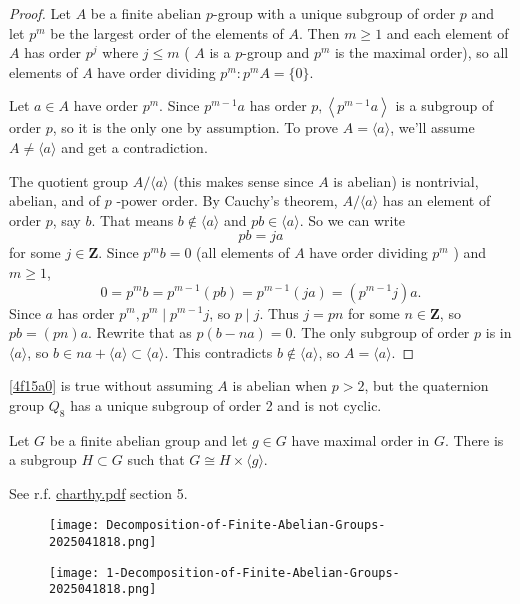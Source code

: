 \begin{proof}
Let $A$ be a finite abelian $p$-group with a unique subgroup of order $p$ and let $p^m$ be the largest order of the elements of $A$. Then $m \geq 1$ and each element of $A$ has order $p^j$ where $j \leq m$ ( $A$ is a $p$-group and $p^m$ is the maximal order), so all elements of $A$ have order dividing $p^m: p^m A=\{0\}$.

Let $a \in A$ have order $p^m$. Since $p^{m-1} a$ has order $p,\left\langle p^{m-1} a\right\rangle$ is a subgroup of order $p$, so it is the only one by assumption. To prove $A=\langle a\rangle$, we'll assume $A \neq\langle a\rangle$ and get a contradiction.

The quotient group $A /\langle a\rangle$ (this makes sense since $A$ is abelian) is nontrivial, abelian, and of $p$ -power order. By Cauchy's theorem, $A /\langle a\rangle$ has an element of order $p$, say $b$. That means $b \notin\langle a\rangle$ and $p b \in\langle a\rangle$. So we can write
\[
p b=j a
\]
for some $j \in \mathbf{Z}$. Since $p^m b=0$ (all elements of $A$ have order dividing $p^m$ ) and $m \geq 1$,
\[
0=p^m b=p^{m-1}(p b)=p^{m-1}(j a)=\left(p^{m-1} j\right) a .
\]
Since $a$ has order $p^m, p^m \mid p^{m-1} j$, so $p \mid j$. Thus $j=p n$ for some $n \in \mathbf{Z}$, so $p b=(p n) a$. Rewrite that as $p(b-n a)=0$. The only subgroup of order $p$ is in $\langle a\rangle$, so $b \in n a+\langle a\rangle \subset\langle a\rangle$. This contradicts $b \notin\langle a\rangle$, so $A=\langle a\rangle$.
\end{proof}

\begin{remark}
\cref{4f15a0}  is true without assuming $A$ is abelian when $p>2$, but the quaternion group $Q_8$ has a unique subgroup of order 2 and is not cyclic.
\end{remark}
\begin{theorem}
Let $G$ be a finite abelian group and let $g \in G$ have maximal order in $G$. There is a subgroup $H \subset G$ such that $G \cong H \times\langle g\rangle$.
\end{theorem}
\begin{note}
See r.f. \href{https://kconrad.math.uconn.edu/blurbs/grouptheory/charthy.pdf}{charthy.pdf} section 5.
\end{note}
\begin{figure}[H]
\centering
\texttt{[image: Decomposition-of-Finite-Abelian-Groups-2025041818.png]}
\label{}
\end{figure}
\begin{figure}[H]
\centering
\texttt{[image: 1-Decomposition-of-Finite-Abelian-Groups-2025041818.png]}
\label{}
\end{figure}
